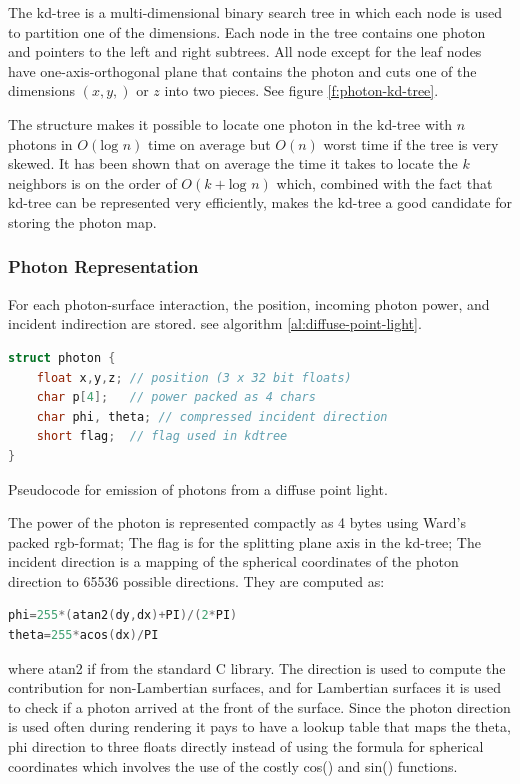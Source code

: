 The kd-tree is a multi-dimensional binary search tree in which each node is used to partition one of the dimensions. Each node in the tree  contains one photon and pointers to the left and right subtrees. All node except for the leaf nodes have one-axis-orthogonal plane that contains the photon and cuts one of the dimensions $(x,y,)$ or $z$ into two pieces. See figure \ref{f:photon-kd-tree}.

The structure makes it possible to locate one photon in the kd-tree with $n$ photons in $O(\text{log }n)$ time on average but $O(n)$ worst time if the tree is very skewed. It has been shown that on average the time it takes to locate the $k$ neighbors is on the order of $O(k+\text{log }n)$ which, combined with the fact that kd-tree can be represented very efficiently, makes the kd-tree a good candidate for storing the photon map.



\subsubsection{Photon Representation}
For each photon-surface interaction, the position, incoming photon power, and incident indirection are stored. see algorithm \ref{al:diffuse-point-light}.

\begin{algorithm}\label{al:diffuse-point-light}
\begin{lstlisting}[language=C++, mathescape]
struct photon {
	float x,y,z; // position (3 x 32 bit floats)
	char p[4];   // power packed as 4 chars
	char phi, theta; // compressed incident direction 
	short flag;  // flag used in kdtree
}
\end{lstlisting}
\caption{Pseudocode for emission of photons from a diffuse point light.}
\end{algorithm}

The power of the photon is represented compactly as 4 bytes using Ward's packed rgb-format\cite{a:Realpixels}; The flag is for the splitting plane axis in the kd-tree; The incident direction is a mapping of the spherical coordinates of the photon direction to 65536 possible directions. They are computed as:

\begin{lstlisting}[language=C++, mathescape]
phi=255*(atan2(dy,dx)+PI)/(2*PI)
theta=255*acos(dx)/PI
\end{lstlisting}

where atan2 if from the standard C library. The direction is used to compute the contribution for non-Lambertian surfaces, and for Lambertian surfaces it is used to check if a photon arrived at the front of the surface. Since the photon direction is used often during rendering it pays to have a lookup table that maps the theta, phi direction to three floats directly instead of using the formula for spherical coordinates which involves the use of the costly cos() and sin() functions.

